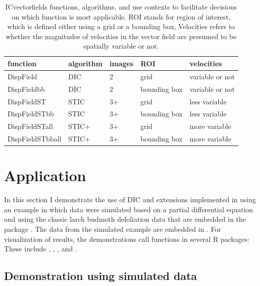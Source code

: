 \begin{Schunk}
\begin{table}

\caption{\label{tab:function-table-tex}ICvectorfields functions, algorithms, and use contexts to facilitate decisions on which function is most applicable. ROI stands for region of interest, which is defined either using a grid or a bounding box, Velocities refers to whether the magnitudes of velocities in the vector field are presumed to be spatially variable or not.}
\centering
\begin{tabular}[t]{l|l|l|l|l}
\hline
function & algorithm & images & ROI & velocities\\
\hline
DispField & DIC & 2 & grid & variable or not\\
\hline
DispFieldbb & DIC & 2 & bounding box & variable or not\\
\hline
DispFieldST & STIC & 3+ & grid & less variable\\
\hline
DispFieldSTbb & STIC & 3+ & bounding box & less variable\\
\hline
DispFieldSTall & STIC+ & 3+ & grid & more variable\\
\hline
DispFieldSTbball & STIC+ & 3+ & bounding box & more variable\\
\hline
\end{tabular}
\end{table}

\end{Schunk}

\hypertarget{application}{%
\section{Application}\label{application}}

In this section I demonstrate the use of DIC and extensions implemented
in  \citep{ICvf} using an example in which data
were simulated based on a partial differential equation and using the
classic larch budmoth defoliation data that are embedded in the
 package \citep{ncf}. The data from the simulated example
are embedded in . For visualization of results,
the demonstrations call functions in several R packages: These include
 \citep{ggplot2}, 
\citep{ggnewscale},  \citep{metR}, and 
\citep{terra}.

\hypertarget{demonstration-using-simulated-data}{%
\subsection{Demonstration using simulated
data}\label{demonstration-using-simulated-data}}

